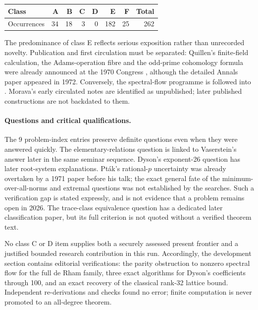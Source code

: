 \begin{center}
\begin{tabular}{lrrrrrrr}
\toprule
Class & A & B & C & D & E & F & Total\\
\midrule
Occurrences & 34 & 18 & 3 & 0 & 182 & 25 & 262\\
\bottomrule
\end{tabular}
\end{center}

The predominance of class E reflects serious exposition rather than
unrecorded novelty.  Publication and first circulation must be separated:
Quillen's finite-field calculation, the Adams-operation fibre and the
odd-prime cohomology formula were already announced at the 1970 Congress
\citep[\S\S2--3]{quillen1971cohomology}, although the detailed Annals paper
appeared in 1972.  Conversely, the spectral-flow programme is followed into
\citet[\S7]{atiyahpatodisinger1976spectral3}.  Morava's early circulated notes
are identified as unpublished; later published constructions are not
backdated to them.

\paragraph{Questions and critical qualifications.}
The 9 problem-index entries preserve definite questions even when
they were answered quickly.  The elementary-relations question is linked to
Vaserstein's answer later in the same seminar sequence.  Dyson's exponent-26
question has later root-system explanations.  Pt\'ak's rational-\(p\)
uncertainty was already overtaken by a 1971 paper before his talk; the exact
general fate of the minimum-over-all-norms and extremal questions was not
established by the searches.  Such a verification gap is stated expressly,
and is not evidence that a problem remains open in 2026.  The trace-class
equivalence question has a dedicated later classification paper, but its
full criterion is not quoted without a verified theorem text.

No class C or D item supplies both a securely assessed present frontier and
a justified bounded research contribution in this run.  Accordingly, the
development section contains editorial verifications: the parity obstruction
to nonzero spectral flow for the full de Rham family, three exact algorithms
for Dyson's coefficients through 100, and an exact recovery of the classical
rank-32 lattice bound.  Independent re-derivations and checks found no error;
finite computation is never promoted to an all-degree theorem.

